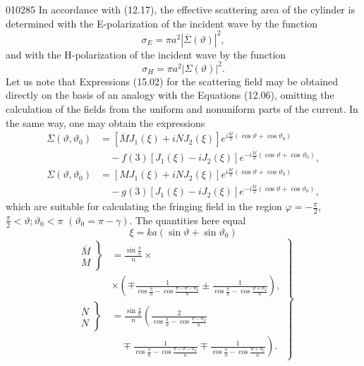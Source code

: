 \begin{scanpage}{0102}{85}
In accordance with (12.17), the effective scattering area of the cylinder is determined with the E-polarization of the incident wave by the function
\[\sigma_E=\pi a^2|\overline\Sigma(\vartheta)|^2,\tag{15.08}\]
and with the H-polarization of the incident wave by the function
\[\sigma_H=\pi a^2|\Sigma(\vartheta)|^2.\tag{15.09}\]
Let us note that Expressions (15.02) for the scattering field may be obtained directly on the basis of an analogy with the Equations (12.06), omitting the calculation of the fields from the uniform and nonuniform parts of the current. In the same way, one may obtain the expressions
\[\begin{aligned}
\overline\Sigma(\vartheta,\vartheta_0)&=[\overline M J_1(\xi)+i\overline N J_2(\xi)]e^{i\frac{kl}2(\cos\vartheta+\cos\vartheta_0)}\\
&\quad-f(3)[J_1(\xi)-iJ_2(\xi)]e^{-i\frac{kl}2(\cos\vartheta+\cos\vartheta_0)},\\
\Sigma(\vartheta,\vartheta_0)&=[M J_1(\xi)+iN J_2(\xi)]e^{i\frac{kl}2(\cos\vartheta+\cos\vartheta_0)}\\
&\quad-g(3)[J_1(\xi)-iJ_2(\xi)]e^{-i\frac{kl}2(\cos\vartheta+\cos\vartheta_0)},
\end{aligned}\tag{15.10}\]
which are suitable for calculating the fringing field in the region $\varphi=-\frac\pi2$, $\frac\pi2<\vartheta;\vartheta_0<\pi$ $(\vartheta_0=\pi-\gamma)$. The quantities here equal
\[\xi=ka(\sin\vartheta+\sin\vartheta_0)\tag{15.11}\]
\[\left.\begin{aligned}
\left.\begin{matrix}\overline M\\M\end{matrix}\right\}&=\frac{\sin\frac\pi n}n\times\\
&\times\left(\mp\frac1{\cos\frac\pi n-\cos\frac{\pi-\vartheta-\vartheta_0}n}\pm\frac1{\cos\frac\pi n-\cos\frac{\vartheta+\vartheta_0}n}\right),\\
\left.\begin{matrix}\overline N\\N\end{matrix}\right\}&=\frac{\sin\frac\pi n}n\left(\frac2{\cos\frac\pi n-\cos\frac{\vartheta-\vartheta_0}n}\right.\\
&\left.\quad\mp\frac1{\cos\frac\pi n-\cos\frac{\pi-\vartheta-\vartheta_0}n}\mp\frac1{\cos\frac\pi n-\cos\frac{\vartheta+\vartheta_0}n}\right).
\end{aligned}\right\}\tag{15.12}\]
\end{scanpage}
